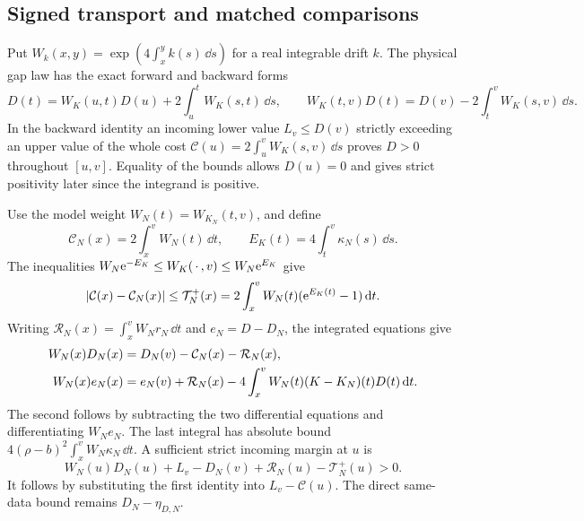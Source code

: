\subsection{Signed transport and matched comparisons}
\label{sec:gt-signed-cost}

Put \(W_k(x,y)=\exp(4\int_x^y k(s)\,\dd s)\) for a real integrable
drift \(k\). The physical gap law has the exact forward and backward
forms
\begin{equation}
 D(t)=W_K(u,t)D(u)+2\int_u^t W_K(s,t)\,\dd s,\qquad
 W_K(t,v)D(t)=D(v)-2\int_t^v W_K(s,v)\,\dd s .
 \label{eq:gt-backward-gap}
\end{equation}
In the backward identity an incoming lower value \(L_v\le D(v)\)
strictly exceeding an upper value of the whole cost
\(\mathcal C(u)=2\int_u^v W_K(s,v)\,\dd s\) proves \(D>0\) throughout
\([u,v]\). Equality of the bounds allows \(D(u)=0\) and gives
strict positivity later since the integrand is positive.

Use the model weight \(W_N(t)=W_{K_N}(t,v)\), and define
\[
 \mathcal C_N(x)=2\int_x^v W_N(t)\,\dd t,\qquad
 E_K(t)=4\int_t^v\kappa_N(s)\,\dd s .
\]
The inequalities \(W_N\mathrm e^{-E_K}\le W_K(\,\cdot\,,v)\le W_N\mathrm e^{E_K}\)
give
\[
 |\mathcal C(x)-\mathcal C_N(x)|
 \le \mathcal T_N^+(x)=2\int_x^v W_N(t)(\mathrm e^{E_K(t)}-1)\,\mathrm d t .
\]
Writing \(\mathcal R_N(x)=\int_x^v W_N r_N\,\dd t\) and
\(e_N=D-D_N\), the integrated equations give
\begin{align}
 W_N(x)D_N(x)&=D_N(v)-\mathcal C_N(x)-\mathcal R_N(x),\notag\\
 W_N(x)e_N(x)&=e_N(v)+\mathcal R_N(x)
       -4\int_x^v W_N(t)(K-K_N)(t)D(t)\,\mathrm d t .
 \label{eq:gt-joint-error}
\end{align}
The second follows by subtracting the two differential equations
and differentiating \(W_N e_N\). The last integral has absolute
bound \(4(\rho-b)^2\int_x^v W_N\kappa_N\,\dd t\).
A sufficient strict incoming margin at \(u\) is
\[
 W_N(u)D_N(u)+L_v-D_N(v)+\mathcal R_N(u)-\mathcal T_N^+(u)>0 .
\]
It follows by substituting the first identity into \(L_v-\mathcal C(u)\).
The direct same-data bound remains \(D_N-\eta_{D,N}\).

